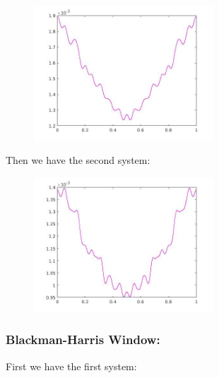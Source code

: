 \documentclass[a4paper,11pt]{article}
\begin{document}
\begin{figure}[!hp]
    \begin{center}
    \includegraphics[width=0.6\textwidth]{images/lab4_29.jpg}
    \end{center}
\end{figure}

Then we have the second system:

\begin{figure}[!hp]
    \begin{center}
    \includegraphics[width=0.6\textwidth]{images/lab4_39.jpg}
    \end{center}
\end{figure}

\newpage

\subsubsection{Blackman-Harris Window:}

First we have the first system:
\end{document}
